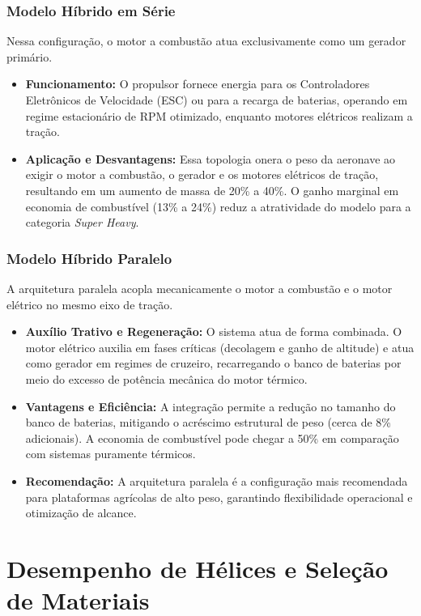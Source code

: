 \documentclass[a4paper,12pt]{article}
\begin{document}
\subsubsection{Modelo Híbrido em Série}
Nessa configuração, o motor a combustão atua exclusivamente como um gerador primário. 
\begin{itemize}
    \item \textbf{Funcionamento:} O propulsor fornece energia para os Controladores Eletrônicos de Velocidade (ESC) ou para a recarga de baterias, operando em regime estacionário de RPM otimizado, enquanto motores elétricos realizam a tração.
    \item \textbf{Aplicação e Desvantagens:} Essa topologia onera o peso da aeronave ao exigir o motor a combustão, o gerador e os motores elétricos de tração, resultando em um aumento de massa de 20\% a 40\%. O ganho marginal em economia de combustível (13\% a 24\%) reduz a atratividade do modelo para a categoria \textit{Super Heavy}.
\end{itemize}

\subsubsection{Modelo Híbrido Paralelo}
A arquitetura paralela acopla mecanicamente o motor a combustão e o motor elétrico no mesmo eixo de tração.

\begin{itemize}
    \item \textbf{Auxílio Trativo e Regeneração:} O sistema atua de forma combinada. O motor elétrico auxilia em fases críticas (decolagem e ganho de altitude) e atua como gerador em regimes de cruzeiro, recarregando o banco de baterias por meio do excesso de potência mecânica do motor térmico.
    \item \textbf{Vantagens e Eficiência:} A integração permite a redução no tamanho do banco de baterias, mitigando o acréscimo estrutural de peso (cerca de 8\% adicionais). A economia de combustível pode chegar a 50\% em comparação com sistemas puramente térmicos.
    \item \textbf{Recomendação:} A arquitetura paralela é a configuração mais recomendada para plataformas agrícolas de alto peso, garantindo flexibilidade operacional e otimização de alcance.
\end{itemize}

\section{Desempenho de Hélices e Seleção de Materiais}
\end{document}
